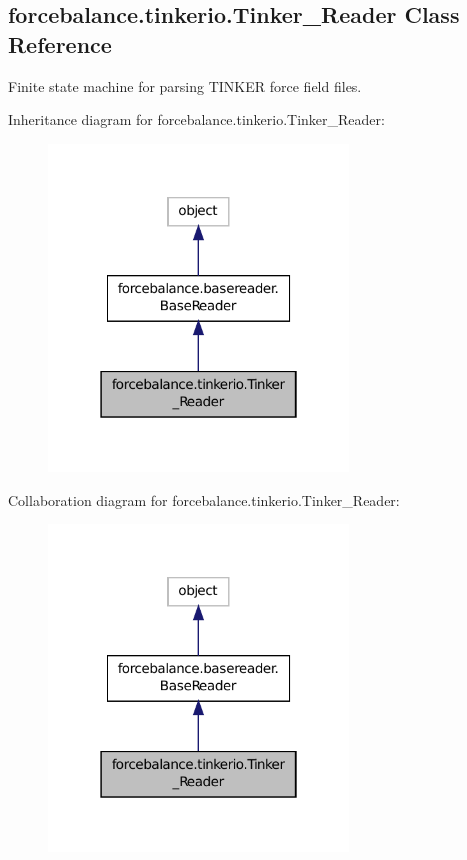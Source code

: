 \hypertarget{classforcebalance_1_1tinkerio_1_1Tinker__Reader}{\subsection{forcebalance.\-tinkerio.\-Tinker\-\_\-\-Reader Class Reference}
\label{classforcebalance_1_1tinkerio_1_1Tinker__Reader}
}


Finite state machine for parsing T\-I\-N\-K\-E\-R force field files.  




Inheritance diagram for forcebalance.\-tinkerio.\-Tinker\-\_\-\-Reader\-:\nopagebreak
\begin{figure}[H]
\begin{center}
\leavevmode
\includegraphics[width=226pt]{classforcebalance_1_1tinkerio_1_1Tinker__Reader__inherit__graph}
\end{center}
\end{figure}


Collaboration diagram for forcebalance.\-tinkerio.\-Tinker\-\_\-\-Reader\-:\nopagebreak
\begin{figure}[H]
\begin{center}
\leavevmode
\includegraphics[width=226pt]{classforcebalance_1_1tinkerio_1_1Tinker__Reader__coll__graph}
\end{center}
\end{figure}
